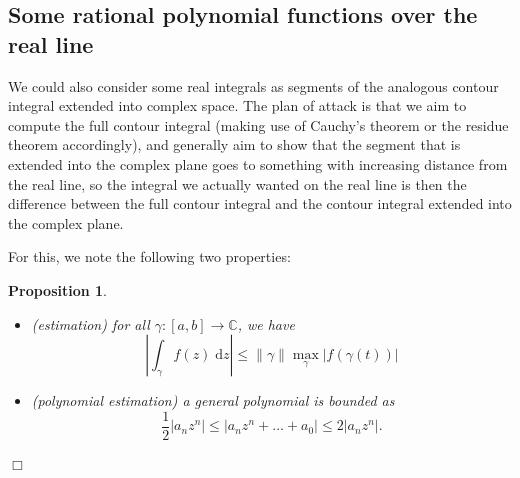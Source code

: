 \documentclass[letter-paper]{tufte-book}
\newtheorem{proposition}[theorem]{\color{pastel-blue}Proposition}
\newcommand{\qedwhite}{\hfill \ensuremath{\Box}}
\begin{document}
\subsection{Some rational polynomial functions over the real line}

We could also consider some real integrals as segments of the analogous contour
integral extended into complex space. The plan of attack is that we aim to
compute the full contour integral (making use of Cauchy's theorem or the residue
theorem accordingly), and generally aim to show that the segment that is
extended into the complex plane goes to something with increasing distance from the
real line, so the integral we actually wanted on the real line is then the
difference between the full contour integral and the contour integral extended
into the complex plane.

For this, we note the following two properties:
\begin{proposition}
\begin{itemize}
  \item (estimation) for all $\gamma:[a, b] \to \mathbb{C}$, we have
  \begin{equation}
    \left|\int_\gamma f(z)\; \mathrm{d}z\right| \leq \|\gamma\| \max_\gamma \left|f(\gamma(t))\right|
  \end{equation}
  
  \item (polynomial estimation) a general polynomial is bounded as
  \begin{equation*}
    \frac{1}{2}\left|a_n z^n\right| \leq \left|a_n z^n + \ldots + a_0 \right| \leq 2\left|a_n z^n\right|.
  \end{equation*}
\end{itemize}
  \qedwhite
\end{proposition}
\end{document}
